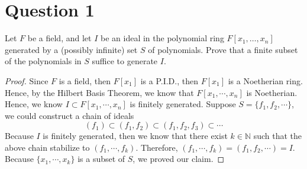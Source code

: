 \section{Question 1}

\begin{question}
    Let $F$ be a field, and let $I$ be an ideal in the polynomial ring $F\left[x_1, \ldots, x_n\right]$ generated by a (possibly infinite) set $S$ of polynomials. Prove that a finite subset of the polynomials in $S$ suffice to generate $I$.
\end{question}

\begin{answer}
    \begin{proof}
        Since $F$ is a field, then $F[x_1]$ is a P.I.D., then $F[x_1]$ is a Noetherian ring. Hence, by the Hilbert Basis Theorem, we know that $F[x_1,\cdots,x_n]$ is Noetherian. Hence, we know $I \subset F[x_1,\cdots,x_n]$ is finitely generated. Suppose $S = \{f_1,f_2,\cdots\}$, we could construct a chain of ideals
        \begin{equation}
            (f_1) \subset (f_1,f_2) \subset (f_1,f_2,f_3) \subset \cdots
        \end{equation}
        Because $I$ is finitely generated, then we know that there exist $k \in \mathbb{N}$ such that the above chain stabilize to $(f_1,\cdots,f_k)$. Therefore, $(f_1,\cdots,f_k) = (f_1,f_2,\cdots) = I$. Because $\{x_1,\cdots,x_k\}$ is a subset of $S$, we proved our claim.
    \end{proof}
\end{answer}